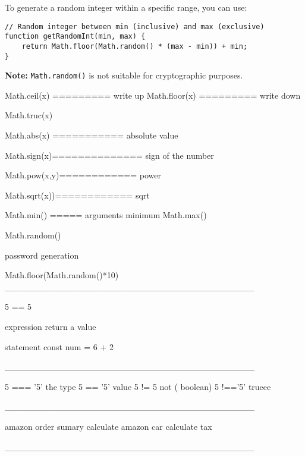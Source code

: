 To generate a random integer within a specific range, you can use:

\begin{verbatim}
// Random integer between min (inclusive) and max (exclusive)
function getRandomInt(min, max) {
    return Math.floor(Math.random() * (max - min)) + min;
}
\end{verbatim}

\textbf{Note:} \texttt{Math.random()} is not suitable for cryptographic purposes.


Math.ceil(x) ========= write up
Math.floor(x) ========= write down

Math.truc(x)



Math.abs(x) =========== absolute value

Math.sign(x)============== sign of the number

Math.pow(x,y)============ power

Math.sqrt(x))============ sqrt

Math.min() ===== arguments minimum 
Math.max()

Math.random()


password generation

Math.floor(Math.random()*10)
________________________________________

5 == 5 

expression return a value


statement 
const num = 6 + 2

________________________________________

5 === '5' the type 
5 == '5' value
 5 != 5 not ( boolean)
5 !=='5' trueee


________________________________________

amazon order sumary
calculate amazon car
calculate tax

________________________________________

